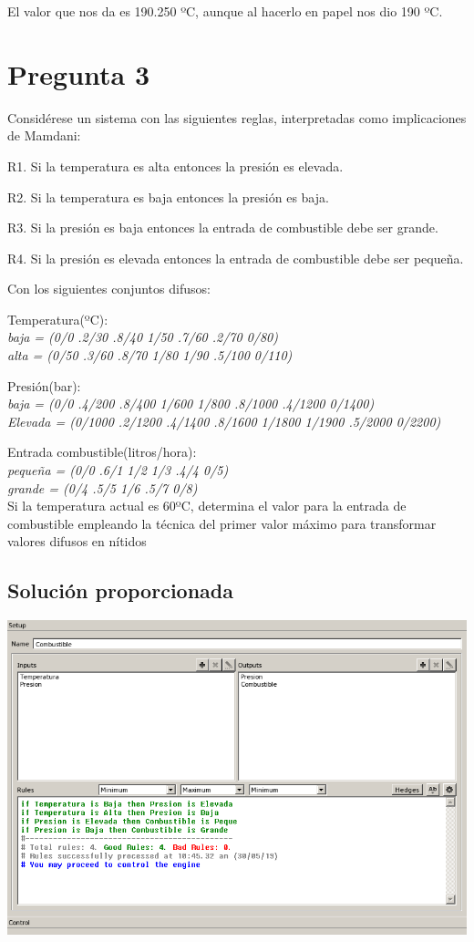 \documentclass{article}
\newcommand\tab[1][1cm]{\hspace*{#1}}
\begin{document}
El valor que nos da es 190.250 ºC, aunque al hacerlo en papel nos dio 190 ºC.

\section{Pregunta 3}

Considérese un sistema con las siguientes reglas, interpretadas como implicaciones de Mamdani:

R1. Si la temperatura es alta entonces la presión es elevada.

R2. Si la temperatura es baja entonces la presión es baja.

R3. Si la presión es baja entonces la entrada de combustible debe ser grande.

R4. Si la presión es elevada entonces la entrada de combustible debe ser pequeña.

Con los siguientes conjuntos difusos:

Temperatura(ºC):\\
\tab \textit{baja = (0/0 .2/30 .8/40 1/50 .7/60 .2/70 0/80)}\\
\tab \textit{alta = (0/50 .3/60 .8/70 1/80 1/90 .5/100 0/110)}

Presión(bar):\\
\tab \textit{baja = (0/0 .4/200 .8/400 1/600 1/800 .8/1000 .4/1200 0/1400)}\\
\tab \textit{Elevada = (0/1000 .2/1200 .4/1400 .8/1600 1/1800 1/1900 .5/2000 0/2200)}

Entrada combustible(litros/hora):\\
\tab \textit{pequeña = (0/0 .6/1 1/2 1/3 .4/4 0/5)}\\
\tab \textit{grande = (0/4 .5/5 1/6 .5/7 0/8)}\\
Si la temperatura actual es 60ºC, determina el valor para la entrada de combustible empleando la técnica del primer valor máximo para transformar valores difusos en nítidos

\subsection{Solución proporcionada}

\begin{center}
\includegraphics[scale=0.5]{images/ej3.png}
\end{center}
\end{document}
